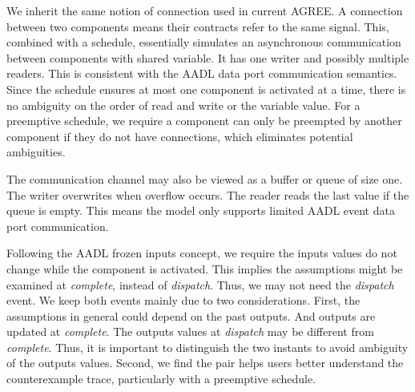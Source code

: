 We inherit the same notion of connection used in current AGREE. A connection between two components means their contracts refer to the same signal. 
This, combined with a schedule, essentially simulates an asynchronous communication between components with shared variable. It has one writer and possibly multiple readers. This is consistent with the AADL data port communication semantics.
Since the schedule ensures at most one component is activated at a time, there is no ambiguity on the order of read and write or the variable value. For a preemptive schedule, we require a component can only be preempted by another component if they do not have connections, which eliminates potential ambiguities.

The communication channel may also be viewed as a buffer or queue of size one. The writer overwrites when overflow occurs. The reader reads the last value if the queue is empty. This means the model only supports limited AADL event data port communication.

Following the AADL frozen inputs concept, we require the inputs values do not change while the component is activated. This implies the assumptions might be examined at \emph{complete}, instead of \emph{dispatch}. Thus, we may not need the \emph{dispatch} event. We keep both events mainly due to two considerations. First, the assumptions in general could depend on the past outputs. And outputs are updated at \emph{complete}. The outputs values at \emph{dispatch} may be different from \emph{complete}. Thus, it is important to distinguish the two instants to avoid ambiguity of the outputs values. Second, we find the pair helps users better understand the counterexample trace, particularly with a preemptive schedule.

